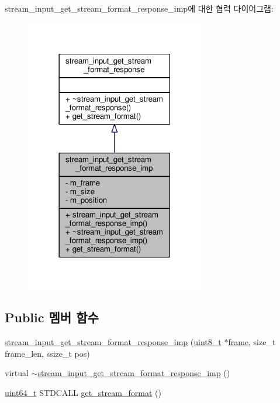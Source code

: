 stream\+\_\+input\+\_\+get\+\_\+stream\+\_\+format\+\_\+response\+\_\+imp에 대한 협력 다이어그램\+:
\nopagebreak
\begin{figure}[H]
\begin{center}
\leavevmode
\includegraphics[width=222pt]{classavdecc__lib_1_1stream__input__get__stream__format__response__imp__coll__graph}
\end{center}
\end{figure}
\subsection*{Public 멤버 함수}
\begin{DoxyCompactItemize}
\item 
\hyperlink{classavdecc__lib_1_1stream__input__get__stream__format__response__imp_a1e8937faea22e118a23330506c3f59c8}{stream\+\_\+input\+\_\+get\+\_\+stream\+\_\+format\+\_\+response\+\_\+imp} (\hyperlink{stdint_8h_aba7bc1797add20fe3efdf37ced1182c5}{uint8\+\_\+t} $\ast$\hyperlink{gst__avb__playbin_8c_ac8e710e0b5e994c0545d75d69868c6f0}{frame}, size\+\_\+t frame\+\_\+len, ssize\+\_\+t pos)
\item 
virtual \hyperlink{classavdecc__lib_1_1stream__input__get__stream__format__response__imp_a065010018bdb9993ec2aa1c95797360f}{$\sim$stream\+\_\+input\+\_\+get\+\_\+stream\+\_\+format\+\_\+response\+\_\+imp} ()
\item 
\hyperlink{parse_8c_aec6fcb673ff035718c238c8c9d544c47}{uint64\+\_\+t} S\+T\+D\+C\+A\+LL \hyperlink{classavdecc__lib_1_1stream__input__get__stream__format__response__imp_a853524daa61b51c7cba18fbb01bc078e}{get\+\_\+stream\+\_\+format} ()
\end{DoxyCompactItemize}

